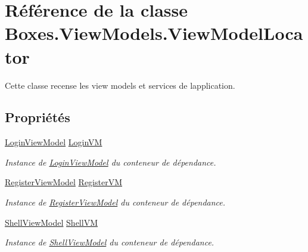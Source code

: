 \hypertarget{class_boxes_1_1_view_models_1_1_view_model_locator}{}\section{Référence de la classe Boxes.\+View\+Models.\+View\+Model\+Locator}
\label{class_boxes_1_1_view_models_1_1_view_model_locator}


Cette classe recense les view models et services de l\textquotesingle{}application.  


\subsection*{Propriétés}
\begin{DoxyCompactItemize}
\item 
\hyperlink{class_boxes_1_1_view_models_1_1_login_view_model}{Login\+View\+Model} \hyperlink{class_boxes_1_1_view_models_1_1_view_model_locator_a80188583bfb52cb2193dfba9133940a1}{Login\+VM}
\begin{DoxyCompactList}\small\item\em Instance de \hyperlink{class_boxes_1_1_view_models_1_1_login_view_model}{Login\+View\+Model} du conteneur de dépendance. \end{DoxyCompactList}\item 
\hyperlink{class_boxes_1_1_view_models_1_1_register_view_model}{Register\+View\+Model} \hyperlink{class_boxes_1_1_view_models_1_1_view_model_locator_a54c1906124307af1f1f1ebce6c641b2a}{Register\+VM}
\begin{DoxyCompactList}\small\item\em Instance de \hyperlink{class_boxes_1_1_view_models_1_1_register_view_model}{Register\+View\+Model} du conteneur de dépendance. \end{DoxyCompactList}\item 
\hyperlink{class_boxes_1_1_view_models_1_1_shell_view_model}{Shell\+View\+Model} \hyperlink{class_boxes_1_1_view_models_1_1_view_model_locator_a15d5c349008d72f034ba495295699007}{Shell\+VM}
\begin{DoxyCompactList}\small\item\em Instance de \hyperlink{class_boxes_1_1_view_models_1_1_shell_view_model}{Shell\+View\+Model} du conteneur de dépendance. \end{DoxyCompactList}\item 

\end{DoxyCompactItemize}
